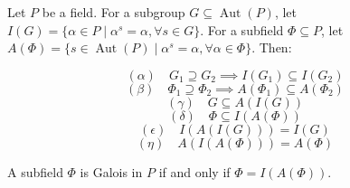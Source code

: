 Let $P$ be a field. For a subgroup $G \subseteq \operatorname{Aut}(P)$, let $I(G) = \{\alpha \in P \mid \alpha^s = \alpha, \forall s \in G\}$. For a subfield $\Phi \subseteq P$, let $A(\Phi) = \{s \in \operatorname{Aut}(P) \mid \alpha^s = \alpha, \forall \alpha \in \Phi\}$. Then:

$$(\alpha)\quad G_1 \supseteq G_2 \implies I(G_1) \subseteq I(G_2)$$
$$(\beta)\quad \Phi_1 \supseteq \Phi_2 \implies A(\Phi_1) \subseteq A(\Phi_2)$$
$$(\gamma)\quad G \subseteq A(I(G))$$
$$(\delta)\quad \Phi \subseteq I(A(\Phi))$$
$$(\epsilon)\quad I(A(I(G))) = I(G)$$
$$(\eta)\quad A(I(A(\Phi))) = A(\Phi)$$

A subfield $\Phi$ is Galois in $P$ if and only if $\Phi = I(A(\Phi))$.
